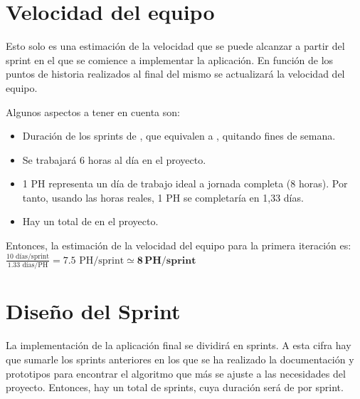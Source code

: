 \newpage

\section{Velocidad del equipo}

Esto solo es una estimación de la velocidad que se puede alcanzar a partir del sprint en el que se comience a implementar la aplicación. En función de los puntos de historia realizados al final del mismo se actualizará la velocidad del equipo.

\bigskip

Algunos aspectos a tener en cuenta son:

\begin{itemize}
    \item Duración de los sprints de \sprintLength, que equivalen a \actualSprintLength, quitando fines de semana.
    \item Se trabajará 6 horas al día en el proyecto.
    \item 1 PH representa un día de trabajo ideal a jornada completa (8 horas). Por tanto, usando las horas reales, 1 PH se completaría en 1,33 días.
    \item Hay un total de \projectph en el proyecto.
\end{itemize}

\bigskip

Entonces, la estimación de la velocidad del equipo para la primera iteración es: $\frac{10 \text{ días/sprint}}{1.33 \text{ días/PH}} = 7.5 \text{ PH/sprint} \simeq \mathbf{8\,PH/sprint}$

\section{Diseño del Sprint}


La implementación de la aplicación final se dividirá en \sprintNro sprints. A esta cifra hay que sumarle los \docSprints sprints anteriores en los que se ha realizado la documentación y prototipos para encontrar el algoritmo que más se ajuste a las necesidades del proyecto. Entonces, hay un total de \totalSprints sprints, cuya duración será de \sprintLength por sprint.


